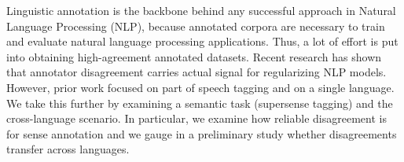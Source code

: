 Linguistic annotation is the backbone behind any successful approach in Natural Language Processing (NLP), because annotated corpora are necessary to train and evaluate natural language processing applications. Thus, a lot of effort is put into obtaining high-agreement annotated datasets. Recent research has shown that annotator disagreement carries actual signal for regularizing NLP models. However, prior work focused on part of speech tagging and on a single language. We take this further by examining a semantic task (supersense tagging) and the cross-language scenario. In particular, we examine how reliable disagreement is for sense annotation and we gauge in a preliminary study whether disagreements transfer across languages.
